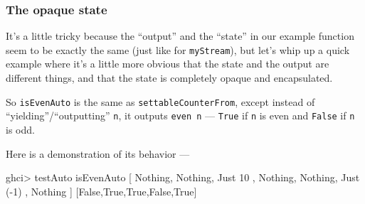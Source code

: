 \documentclass[]{article}
\newenvironment{Shaded}{}{}
\newcommand{\KeywordTok}[1]{\textcolor[rgb]{0.00,0.44,0.13}{\textbf{{#1}}}}
\newcommand{\DataTypeTok}[1]{\textcolor[rgb]{0.56,0.13,0.00}{{#1}}}
\newcommand{\DecValTok}[1]{\textcolor[rgb]{0.25,0.63,0.44}{{#1}}}
\newcommand{\CommentTok}[1]{\textcolor[rgb]{0.38,0.63,0.69}{\textit{{#1}}}}
\newcommand{\OtherTok}[1]{\textcolor[rgb]{0.00,0.44,0.13}{{#1}}}
\newcommand{\FunctionTok}[1]{\textcolor[rgb]{0.02,0.16,0.49}{{#1}}}
\newcommand{\NormalTok}[1]{{#1}}
\begin{document}
\subsubsection{The opaque state}\label{the-opaque-state}

It's a little tricky because the ``output'' and the ``state'' in our
example function seem to be exactly the same (just like for
\texttt{myStream}), but let's whip up a quick example where it's a
little more obvious that the state and the output are different things,
and that the state is completely opaque and encapsulated.

\begin{Shaded}
\end{Shaded}

So \texttt{isEvenAuto} is the same as \texttt{settableCounterFrom},
except instead of ``yielding''/``outputting'' \texttt{n}, it outputs
\texttt{even\ n} --- \texttt{True} if \texttt{n} is even and
\texttt{False} if \texttt{n} is odd.

Here is a demonstration of its behavior ---

\begin{Shaded}
\begin{Highlighting}[]
\NormalTok{ghci}\FunctionTok{>} \NormalTok{testAuto isEvenAuto  [ }\DataTypeTok{Nothing}\NormalTok{, }\DataTypeTok{Nothing}\NormalTok{, }\DataTypeTok{Just} \DecValTok{10}
                           \NormalTok{, }\DataTypeTok{Nothing}\NormalTok{, }\DataTypeTok{Nothing}\NormalTok{, }\DataTypeTok{Just} \NormalTok{(}\FunctionTok{-}\DecValTok{1}\NormalTok{)}
                           \NormalTok{, }\DataTypeTok{Nothing} \NormalTok{]}
\NormalTok{[}\DataTypeTok{False}\NormalTok{,}\DataTypeTok{True}\NormalTok{,}\DataTypeTok{True}\NormalTok{,}\DataTypeTok{False}\NormalTok{,}\DataTypeTok{True}\NormalTok{]}
\end{Highlighting}
\end{Shaded}
\end{document}
